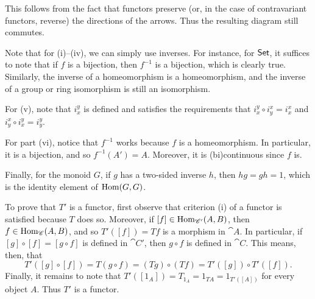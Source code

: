 \documentclass[../../solutions.tex]{subfiles}
\begin{document}
\begin{exercise} \leavevmode
This follows from the fact that functors preserve (or, in the case of contravariant functors, reverse) the directions of the arrows. Thus the resulting diagram still commutes. 
\end{exercise} 

\begin{exercise} \leavevmode
Note that for (i)--(iv), we can simply use inverses. For instance, for $\mathsf{Set}$, it suffices to note that if $f$ is a bijection, then $f^{-1}$ is a bijection, which is clearly true. Similarly, the inverse of a homeomorphism is a homeomorphism, and the inverse of a group or ring isomorphism is still an isomorphism. 

For (v), note that $i_x^y$ is defined and satisfies the requirements that $i_x^y\circ i_y^x=i_x^x$ and $i_y^x\circ i_x^y=i_y^y$. 

For part (vi), notice that $f^{-1}$ works because $f$ is a homeomorphism. In particular, it is a bijection, and so $f^{-1}(A')=A$. Moreover, it is (bi)continuous since $f$ is. 

Finally, for the monoid $G$, if $g$ has a two-sided inverse $h$, then $hg=gh=1$, which is the identity element of $\operatorname{Hom}(G,G)$. 
\end{exercise} 

\begin{exercise} \leavevmode
To prove that $T'$ is a functor, first observe that criterion (i) of a functor is satisfied because $T$ does so. Moreover, if $[f]\in\operatorname{Hom}_{\mathscr{C}'}(A,B)$, then $f\in\operatorname{Hom}_{\mathscr{C}}(A,B)$, and so $T'([f])=Tf$ is a morphism in $\cat A$. In particular, if $[g]\circ[f]=[g\circ f]$ is defined in $\cat C'$, then $g\circ f$ is defined in $\cat C$. This means, then, that \[T'([g]\circ[f])=T(g\circ f)=(Tg)\circ(Tf)=T'([g])\circ T'([f]).\] Finally, it remains to note that $T'([1_A])=T_{1_A}=1_{TA}=1_{T'([A])}$ for every object $A$. Thus $T'$ is a functor.
\end{exercise} 
\end{document}
